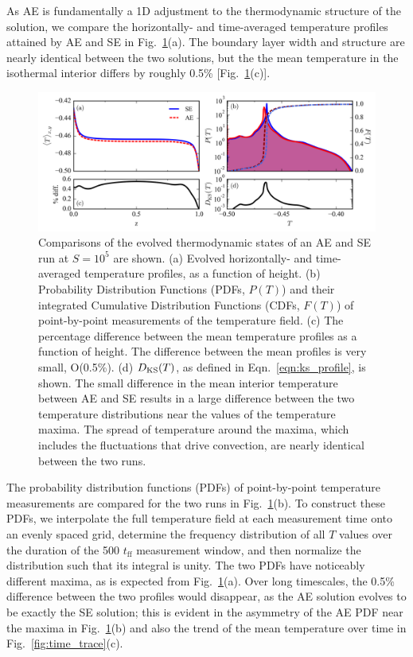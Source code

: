 As AE is fundamentally a 1D adjustment to the thermodynamic structure of the
solution, we compare the horizontally- and time-averaged temperature profiles 
attained by AE and SE in Fig.~\ref{fig:temp_comparison}(a).  
The boundary layer width and structure are  
nearly identical between the two solutions, but the
the mean temperature in the isothermal interior differs by roughly 0.5\%
[Fig.~\ref{fig:temp_comparison}(c)]. 

\begin{figure}[ht!]
\includegraphics[width=\textwidth]{./figs/temp_comparison.pdf}
\caption[Evolved thermodynamic states of AE and SE simulations.]
{Comparisons of the evolved thermodynamic states of an AE and SE run
at $S = 10^{5}$ are shown.  (a) Evolved horizontally- and time-averaged 
temperature profiles, as a function of height.
(b) Probability Distribution Functions (PDFs, $P(T)$) and their integrated
Cumulative Distribution Functions (CDFs, $F(T)$)
of point-by-point measurements of the temperature field.
(c) The percentage difference between the mean temperature profiles as a function of height.
The difference between the mean profiles is very small, O(0.5\%).
(d) $D_{\text{KS}}(T)$, as defined in Eqn.~\ref{eqn:ks_profile}, is shown. The small
difference in the mean interior temperature between AE and SE
results in a large difference between the two temperature distributions near the values
of the temperature maxima.  The spread of temperature around the maxima, which includes the 
fluctuations that drive convection, are nearly identical between the two runs.
\label{fig:temp_comparison} }
\end{figure}





The probability distribution functions (PDFs)
of point-by-point temperature measurements are compared for the two runs
in Fig.~\ref{fig:temp_comparison}(b). To construct these PDFs, 
we interpolate the full temperature field
at each measurement time onto an evenly spaced grid, determine the
frequency distribution of all $T$ values over the duration of the 500 $t_{\text{ff}}$
measurement window, and then normalize the
distribution such that its integral is unity.  The two PDFs have noticeably
different maxima, as is expected from Fig.~\ref{fig:temp_comparison}(a). 
Over long timescales, the 0.5\% difference between the two profiles would
disappear, as the AE solution evolves to be exactly the SE solution; this
is evident in the asymmetry of the AE PDF near the maxima
in Fig.~\ref{fig:temp_comparison}(b) and also
the trend of the mean temperature over time in Fig.~\ref{fig:time_trace}(c).

